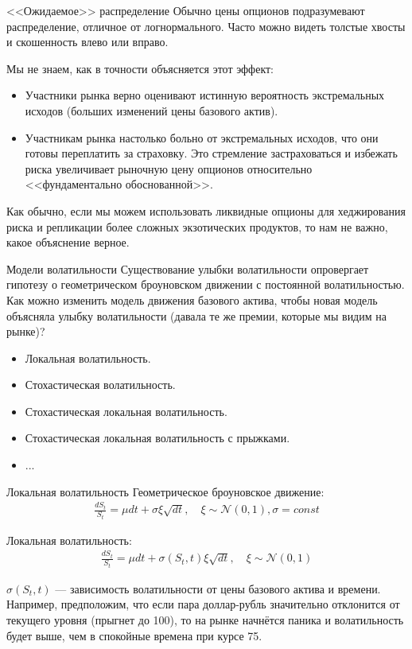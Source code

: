 \documentclass{beamer}
\begin{document}
\begin{frame}{<<Ожидаемое>> распределение}
\justify
Обычно цены опционов подразумевают распределение, отличное от логнормального. Часто можно видеть толстые хвосты и скошенность влево или вправо.

\justify
Мы не знаем, как в точности объясняется этот эффект:
\begin{itemize}
\item Участники рынка верно оценивают истинную вероятность экстремальных исходов (больших изменений цены базового актив).
\item Участникам рынка настолько больно от экстремальных исходов, что они готовы переплатить за страховку. Это стремление застраховаться и избежать риска увеличивает рыночную цену опционов относительно <<фундаментально обоснованной>>.
\end{itemize}

\justify
Как обычно, если мы можем использовать ликвидные опционы для хеджирования риска и репликации более сложных экзотических продуктов, то нам не важно, какое объяснение верное.
\end{frame}



\begin{frame}{Модели волатильности}
\justify
Существование улыбки волатильности опровергает гипотезу о геометрическом броуновском движении с постоянной волатильностью. Как можно изменить модель движения базового актива, чтобы новая модель объясняла улыбку волатильности (давала те же премии, которые мы видим на рынке)?

\justify
\begin{itemize}
\item Локальная волатильность.
\item Стохастическая волатильность.
\item Стохастическая локальная волатильность.
\item Стохастическая локальная волатильность с прыжками.
\item ...
\end{itemize}
\end{frame}



\begin{frame}{Локальная волатильность}
\justify
Геометрическое броуновское движение:
\begin{align*}
\frac{dS_t}{S_t} = \mu dt + \sigma\xi\sqrt{dt}, \quad \xi \sim \mathcal{N}(0, 1), \sigma = const
\end{align*}

\justify
Локальная волатильность:
\begin{align*}
\frac{dS_t}{S_t} = \mu dt + \sigma(S_t, t)\xi\sqrt{dt}, \quad \xi \sim \mathcal{N}(0, 1)
\end{align*}

\justify
$\sigma(S_t, t)$ --- зависимость волатильности от цены базового актива и времени. Например, предположим, что если пара доллар-рубль значительно отклонится от текущего уровня (прыгнет до 100), то на рынке начнётся паника и волатильность будет выше, чем в спокойные времена при курсе 75.
\end{frame}
\end{document}
